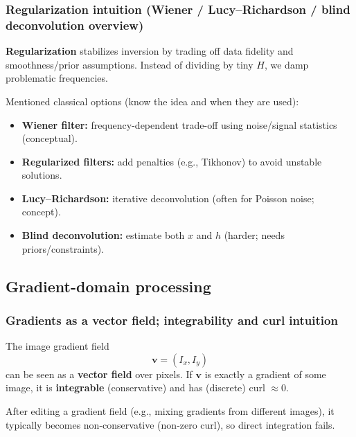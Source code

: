 \documentclass[11pt,a4paper]{article}
\newcommand{\vct}[1]{\bm{#1}}
\begin{document}
\subsubsection{Regularization intuition (Wiener / Lucy--Richardson / blind deconvolution overview)}

\begin{intbox}
\textbf{Regularization} stabilizes inversion by trading off data fidelity and smoothness/prior assumptions.
Instead of dividing by tiny $H$, we damp problematic frequencies.
\end{intbox}

Mentioned classical options (know the idea and when they are used):
\begin{itemize}
  \item \textbf{Wiener filter:} frequency-dependent trade-off using noise/signal statistics (conceptual).
  \item \textbf{Regularized filters:} add penalties (e.g., Tikhonov) to avoid unstable solutions.
  \item \textbf{Lucy--Richardson:} iterative deconvolution (often for Poisson noise; concept).
  \item \textbf{Blind deconvolution:} estimate both $x$ and $h$ (harder; needs priors/constraints).
\end{itemize}


\subsection{Gradient-domain processing}

\subsubsection{Gradients as a vector field; integrability and curl intuition}

\begin{defbox}
The image gradient field
\[
\vct{v} = (I_x, I_y)
\]
can be seen as a \textbf{vector field} over pixels.
If $\vct{v}$ is exactly a gradient of some image, it is \textbf{integrable} (conservative) and has (discrete) curl $\approx 0$.
\end{defbox}

\begin{notebox}
After editing a gradient field (e.g., mixing gradients from different images), it typically becomes non-conservative
(non-zero curl), so direct integration fails.
\end{notebox}
\end{document}
